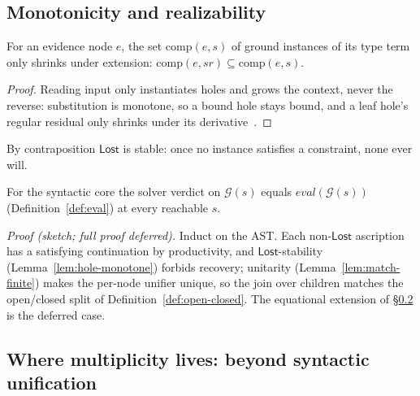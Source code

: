 \subsection{Monotonicity and realizability}
\label{sec:guarantees}

\begin{lemma}
  \label{lem:hole-monotone}
  For an evidence node $e$, the set $\mathrm{comp}(e, s)$ of ground instances of
  its type term only shrinks under extension: $\mathrm{comp}(e, sr) \subseteq
  \mathrm{comp}(e, s)$.
\end{lemma}
\begin{proof}
  Reading input only instantiates holes and grows the context, never the
  reverse: substitution is monotone, so a bound hole stays bound, and a leaf
  hole's regular residual only shrinks under its
  derivative~\cite{owens2009regex}.
\end{proof}

By contraposition $\mathsf{Lost}$ is stable: once no instance satisfies a
constraint, none ever will.

\begin{theorem}
  \label{thm:solver-correct}
  For the syntactic core the solver verdict on $\mathcal{G}(s)$ equals
  $\mathit{eval}(\mathcal{G}(s))$ (Definition~\ref{def:eval}) at every reachable
  $s$.
\end{theorem}

\noindent\emph{Proof (sketch; full proof deferred).} Induct on the AST. Each
non-$\mathsf{Lost}$ ascription has a satisfying continuation by productivity, and
$\mathsf{Lost}$-stability (Lemma~\ref{lem:hole-monotone}) forbids recovery;
unitarity (Lemma~\ref{lem:match-finite}) makes the per-node unifier unique, so the
join over children matches the open/closed split of
Definition~\ref{def:open-closed}. The equational extension of
\S\ref{sec:ambiguity} is the deferred case.

\subsection{Where multiplicity lives: beyond syntactic unification}
\label{sec:ambiguity}


